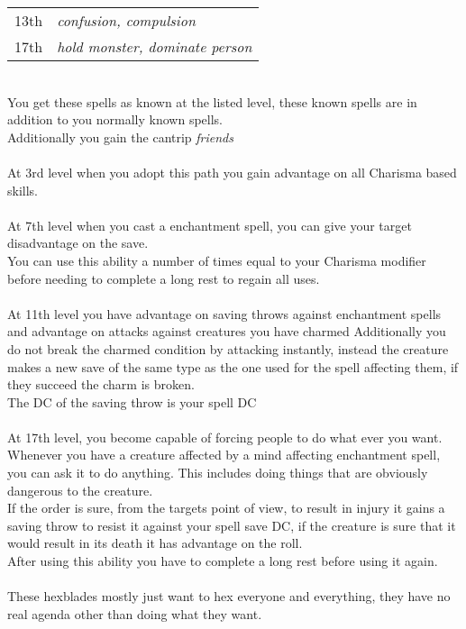 \documentclass[a4paper]{article}
\begin{document}
\begin{multicols}{2}
\begin{tabular}{cp{5cm}}
13th                & \textit{confusion, compulsion}\\
\rowcolor[HTML]{B8EFAD} 
17th                & \textit{hold monster, dominate person}\\
\end{tabular}
\\You get these spells as known at the listed level, these known spells are in addition to you normally known spells.\\
Additionally you gain the cantrip \textit{friends}\\
\\
At 3rd level when you adopt this path you gain advantage on all Charisma based skills.\\
\\
At 7th level when you cast a enchantment spell, you can give your target disadvantage on the save.\\
You can use this ability a number of times equal to your Charisma modifier before needing to complete a long rest to regain all uses.\\
\\
At 11th level you have advantage on saving throws against enchantment spells and advantage on attacks against creatures you have charmed
\indent Additionally you do not break the charmed condition by attacking instantly, instead the creature makes a new save of the same type as the one used for the spell affecting them, if they succeed the charm is broken.\\
\indent The DC of the saving throw is your spell DC\\
\\
At 17th level, you become capable of forcing people to do what ever you want. Whenever you have a creature affected by a mind affecting enchantment spell, you can ask it to do anything. This includes doing things that are obviously dangerous to the creature.\\
If the order is sure, from the targets point of view, to result in injury it gains a saving throw to resist it against your spell save DC, if the creature is sure that it would result in its death it has advantage on the roll.\\
After using this ability you have to complete a long rest before using it again.\\
\\
These hexblades mostly just want to hex everyone and everything, they have no real agenda other than doing what they want.\\

\end{multicols}
\end{document}
